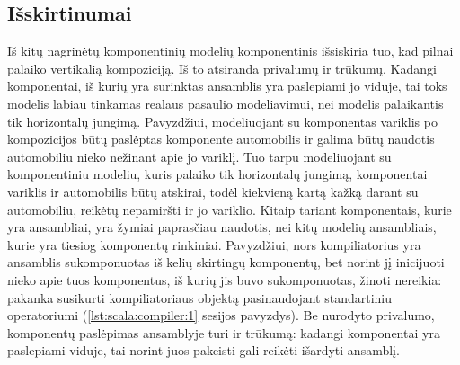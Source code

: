 \subsection{Išskirtinumai}

Iš kitų \cite{classification-framework-for-scm} nagrinėtų komponentinių
modelių  komponentinis išsiskiria tuo, kad
pilnai palaiko vertikalią kompoziciją. Iš to atsiranda privalumų
ir trūkumų. Kadangi komponentai, iš kurių yra surinktas ansamblis
yra paslepiami jo viduje, tai toks modelis labiau tinkamas realaus
pasaulio modeliavimui, nei modelis palaikantis tik horizontalų jungimą.
Pavyzdžiui, modeliuojant su  komponentas variklis po
kompozicijos būtų paslėptas komponente automobilis ir galima būtų
naudotis automobiliu nieko nežinant apie jo variklį. Tuo tarpu
modeliuojant su komponentiniu modeliu, kuris palaiko tik horizontalų
jungimą, komponentai variklis ir automobilis būtų atskirai, todėl
kiekvieną kartą kažką darant su automobiliu, reikėtų nepamiršti
ir jo variklio. Kitaip tariant  komponentais, kurie
yra ansambliai, yra žymiai paprasčiau naudotis, nei kitų modelių
ansambliais, kurie yra tiesiog komponentų rinkiniai. Pavyzdžiui,
nors  kompiliatorius yra ansamblis sukomponuotas
iš kelių skirtingų komponentų, bet norint jį inicijuoti nieko apie
tuos komponentus, iš kurių jis buvo sukomponuotas, žinoti nereikia:
pakanka susikurti kompiliatoriaus objektą pasinaudojant standartiniu
 operatoriumi (\ref{lst:scala:compiler:1} 
sesijos pavyzdys). Be nurodyto privalumo, komponentų paslėpimas
ansamblyje turi ir trūkumą: kadangi komponentai yra paslepiami viduje,
tai norint juos pakeisti gali reikėti išardyti ansamblį.


